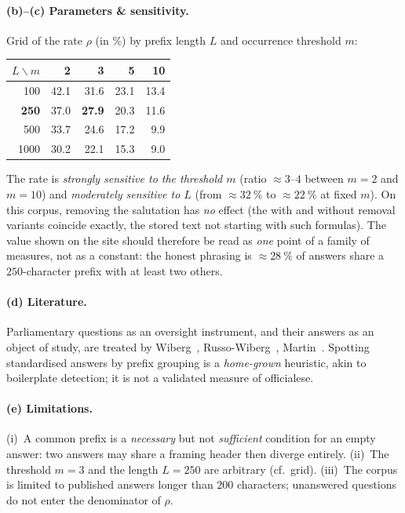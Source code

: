 \paragraph{(b)--(c) Parameters \& sensitivity.} Grid of the rate $\rho$ (in \%) by
prefix length $L$ and occurrence threshold $m$:
\begin{center}\small
\begin{tabular}{r|rrrr}
\toprule
$L\backslash m$ & 2 & \textbf{3} & 5 & 10 \\
\midrule
100  & 42.1 & 31.6 & 23.1 & 13.4 \\
\textbf{250}  & 37.0 & \textbf{27.9} & 20.3 & 11.6 \\
500  & 33.7 & 24.6 & 17.2 & \phantom{0}9.9 \\
1000 & 30.2 & 22.1 & 15.3 & \phantom{0}9.0 \\
\bottomrule
\end{tabular}
\end{center}
The rate is \emph{strongly sensitive to the threshold $m$} (ratio $\approx 3$--$4$
between $m=2$ and $m=10$) and \emph{moderately sensitive to $L$} (from $\approx
32~\%$ to $\approx 22~\%$ at fixed $m$). On this corpus, removing the salutation has
\emph{no} effect (the \og{}with\fg{} and \og{}without\fg{} removal variants
coincide exactly, the stored text not starting with such formulas). The value
shown on the site should therefore be read as \emph{one} point of a family of
measures, not as a constant: the honest phrasing is \og{}$\approx 28~\%$ of answers
share a $250$-character prefix with at least two others\fg{}.

\paragraph{(d) Literature.} Parliamentary questions as an oversight instrument, and
their answers as an object of study, are treated by Wiberg~\cite{wiberg1995},
Russo-Wiberg~\cite{rw2010}, Martin~\cite{martin2011}. Spotting standardised answers
by prefix grouping is a \emph{home-grown} heuristic, akin to boilerplate detection;
it is not a validated measure of \og{}officialese\fg{}.

\paragraph{(e) Limitations.} (i)~A common prefix is a \emph{necessary} but not
\emph{sufficient} condition for an \og{}empty\fg{} answer: two answers may share a
framing header then diverge entirely. (ii)~The threshold $m=3$ and the length
$L=250$ are arbitrary (cf.~grid). (iii)~The corpus is limited to published answers
longer than $200$ characters; unanswered questions do not enter the denominator of
$\rho$.


